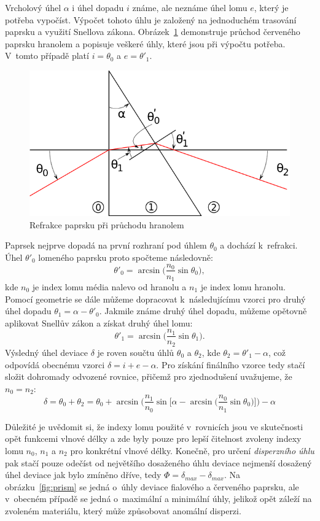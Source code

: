 Vrcholový úhel $\alpha$ i úhel dopadu $i$
známe, ale neznáme úhel lomu $e$, který je
potřeba vypočíst. Výpočet tohoto úhlu je
založený na jednoduchém trasování paprsku a využití
Snellova zákona. Obrázek~\ref{fig:prism_deviation}
demonstruje průchod červeného paprsku hranolem a
popisuje veškeré úhly, které jsou při výpočtu
potřeba. V~tomto případě platí $i = \theta_0$
a $e = \theta'_1$.
\begin{figure}[htbp]
    \centering
    \includegraphics[scale=0.4]{img/prism_deviation.png}
    \caption{Refrakce paprsku při průchodu hranolem}
    \label{fig:prism_deviation}
\end{figure}
Paprsek nejprve dopadá na první rozhraní pod
úhlem $\theta_0$ a dochází k~refrakci. Úhel
$\theta'_0$ lomeného paprsku proto spočteme
následovně:
$$
\theta'_0 = \arcsin\Big(\frac{n_0}{n_1}
\sin\theta_0\Big),
$$
kde $n_0$ je index lomu média nalevo od hranolu
a $n_1$ je index lomu hranolu. Pomocí geometrie
se dále můžeme dopracovat k~následujícímu vzorci pro
druhý úhel dopadu $\theta_1 = \alpha - \theta'_0$.
Jakmile známe druhý úhel dopadu, můžeme opětovně
aplikovat Snellův zákon a získat druhý úhel lomu:
$$
\theta'_1 = \arcsin\Big(\frac{n_1}{n_2}
\sin\theta_1\Big).
$$
Výsledný úhel deviace $\delta$ je roven
součtu úhlů $\theta_0$ a $\theta_2$, kde
$\theta_2 = \theta'_1 - \alpha$, což odpovídá
obecnému vzorci $\delta = i + e - \alpha$.
Pro získání finálního vzorce tedy stačí
složit dohromady odvozené rovnice, přičemž pro
zjednodušení uvažujeme, že $n_0 = n_2$:
$$
\delta = \theta_0 + \theta_2 =
\theta_0 + \arcsin\Big(
\frac{n_1}{n_0}\sin\Big[
\alpha - \arcsin\Big(
\frac{n_0}{n_1}\sin\theta_0
\Big)\Big]\Big) - \alpha
$$

Důležité je uvědomit si, že indexy lomu použité
v~rovnicích jsou ve skutečnosti opět funkcemi
vlnové délky a zde byly pouze pro lepší čitelnost
zvoleny indexy lomu $n_0$, $n_1$ a $n_2$ pro
konkrétní vlnové délky. Konečně, pro určení
\textit{disperzního úhlu} pak stačí pouze odečíst
od největšího dosaženého úhlu deviace nejmenší
dosažený úhel deviace jak bylo zmíněno dříve,
tedy $\Phi = \delta_{max} - \delta_{max}$.
Na obrázku~\ref{fig:prism} se jedná o~úhly
deviace fialového a červeného paprsku, ale
v~obecném případě se jedná o~maximální a minimální
úhly, jelikož opět záleží na zvoleném materiálu,
který může způsobovat anomální disperzi.


